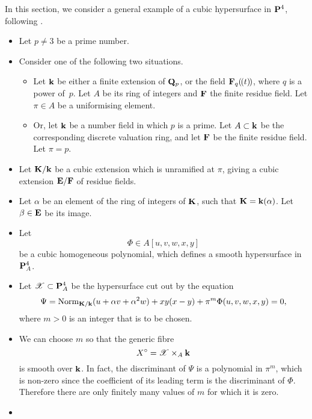 In this section,
we consider a general example of a cubic hypersurface in $\bbP^4$,
following \cite{CTP}.

\begin{itemize}
    \item
        Let $p \neq 3$ be a prime number.
    \item
        Consider one of the following two situations.
        \begin{itemize}
            \item
                Let $\bbk$ be either a finite extension of $\bbQ_p$, or
                the field $\bbF_q \doubleparen{t}$, where $q$ is a power of~$p$.
                Let $A$ be its ring of integers and $\bbF$ the finite residue field.
                Let $\pi \in A$ be a uniformising element. 
            \item
                Or, let $\bbk$ be a number field in which $p$ is a prime.
                Let $A \subset \bbk$ be the corresponding discrete valuation ring,
                and let $\bbF$ be the finite residue field. Let $\pi = p$.
        \end{itemize}
    \item
        Let $\bbK / \bbk$ be a cubic extension which is unramified at $\pi$, giving a cubic extension $\bbE / \bbF$ of residue fields.
    \item
        Let $\alpha$ be an element of the ring of integers of $\bbK$,
        such that $\bbK = \bbk (\alpha)$.
        Let $\beta \in \bbE$ be its image.
    \item
        Let
        \[ \Phi \in A [ u, v, w, x, y ] \]
        be a cubic homogeneous polynomial,
        which defines a smooth hypersurface in $\bbP_A^4$.
    \item
        Let $\mathscr{X} \subset \bbP_A^4$ be the hypersurface cut out by the equation
        \[ \Psi = \operatorname{Norm}_{\bbK / \bbk} (u + \alpha v + \alpha^2 w)
            + x y (x - y) + \pi^m \Phi (u, v, w, x, y) = 0, \]
        where $m > 0$ is an integer that is to be chosen.
    \item
        We can choose $m$ so that the generic fibre 
        \[ X^\circ = \mathscr{X} \times_A \bbk \]
        is smooth over $\bbk$.
        In fact, the discriminant \cite[Article~105, p.~93]{salmon} of $\Psi$ is a polynomial in $\pi^m$,
        which is non-zero since the coefficient of its leading term is the discriminant of $\Phi$.
        Therefore there are only finitely many values of $m$ for which it is zero.
    \item

\end{itemize}
